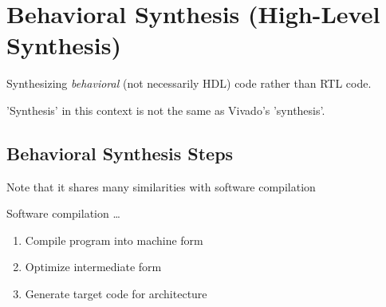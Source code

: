 \documentclass{article}
\begin{document}
\newpage
\section{Behavioral Synthesis (High-Level Synthesis)}
Synthesizing \textit{behavioral} (not necessarily HDL) code rather than RTL code.

'Synthesis' in this context is not the same as Vivado's 'synthesis'.


\subsection{Behavioral Synthesis Steps}
Note that it shares many similarities with software compilation

\begin{figure}[htp]%
    \centering
    \qquad
    \caption{}%
\end{figure}

Software compilation \dots
\begin{enumerate}
    \item Compile program into machine form
    \item Optimize intermediate form
    \item Generate target code for architecture
\end{enumerate}
\end{document}
